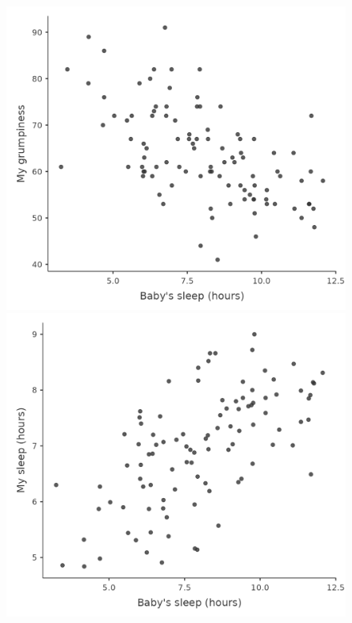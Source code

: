 \documentclass[
  a4paper,
]{book}
\begin{document}
\begin{figure}[h!]

\begin{minipage}[b]{0.50\linewidth}

{\centering 

\includegraphics{images/fig12-2a.png}

}

\subcaption{\label{fig-fig12-3a}}
\end{minipage}%
%
\begin{minipage}[b]{0.50\linewidth}

{\centering 

\includegraphics{images/fig12-3b.png}

}
\end{minipage}
\end{figure}
\end{document}
